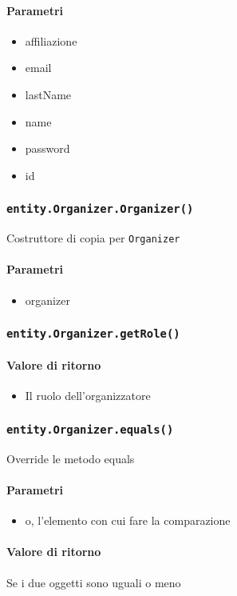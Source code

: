 \paragraph{Parametri}
\begin{itemize}
\item affiliazione
\item email
\item lastName
\item name
\item password
\item id
\end{itemize}

\subsubsection{\texttt{entity.Organizer.Organizer()}}
Costruttore di copia per \texttt{Organizer}
\paragraph{Parametri}
\begin{itemize}
\item organizer
\end{itemize}

\subsubsection{\texttt{entity.Organizer.getRole()}}
\paragraph{Valore di ritorno}
\begin{itemize}
\item Il ruolo dell'organizzatore
\end{itemize}

\subsubsection{\texttt{entity.Organizer.equals()}}
Override le metodo equals
\paragraph{Parametri}
\begin{itemize}
\item o, l'elemento con cui fare la comparazione
\end{itemize}
\paragraph{Valore di ritorno}
Se i due oggetti sono uguali o meno

